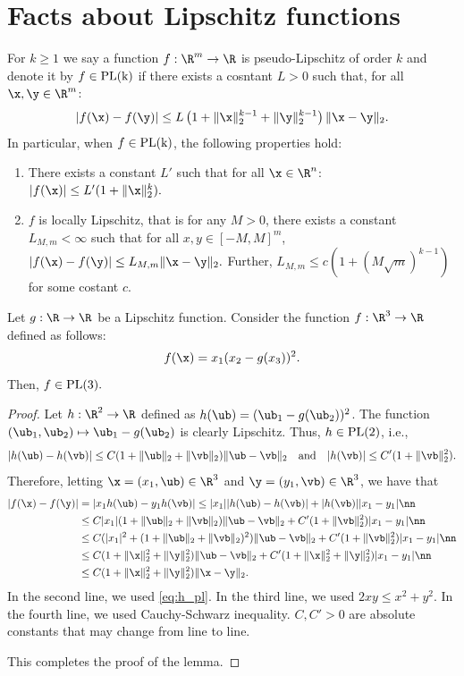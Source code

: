 \section{Facts about Lipschitz functions}\label{SM useful fact}
For $k\geq 1$ we say a function $f:\R^m\rightarrow\R$ is pseudo-Lipschitz of order $k$ and denote it by $f\in \rm{PL}(k)$ if there exists a cosntant $L>0$ such that, for all $\x,\y\in\R^m$:
\begin{align}
|f(\x)-f(\y)|\leq L\left(1+\|\x\|_2^{k-1}+\|\y\|_2^{k-1}\right)\|\x-\y\|_2.\label{PL func}
\end{align}
In particular, when $f\in\rm{PL}(k)$, the following properties hold:
\begin{enumerate}
\item There exists a constant $L'$ such that for all $\x\in\R^n$: $|f(\x)|\leq L'(1+\|\x\|_2^k).$

\item $f$ is locally Lipschitz, that is for any $M>0$, there exists a constant $L_{M,m}<\infty$ such that for all $x,y\in[-M,M]^m$,
$
|f(\x)-f(\y)| \leq L_{M,m}\|\x-\y\|_2.
$
Further, $L_{M,m}\leq c(1+(M\sqrt{m})^{k-1})$ for some costant $c$.
\end{enumerate}


\begin{lemma}
Let $g:\R\rightarrow\R$ be a Lipschitz function. Consider the function $f:\R^3\rightarrow\R$ defined as follows:
$$
f(\x) = x_1(x_2-g(x_3))^2.
$$
Then, $f\in\rm{PL}(3).$
\end{lemma}

\begin{proof}
Let $h:\R^2\rightarrow\R$ defined as $h(\ub)=(\ub_1-g(\ub_2))^2$. The function $(\ub_1,\ub_2)\mapsto\ub_1-g(\ub_2)$ is clearly Lipschitz. Thus, $h\in\rm{PL}(2)$, i.e., 
\begin{align}
|h(\ub)-h(\vb)| \leq C(1+\|\ub\|_2+\|\vb\|_2)\|\ub-\vb\|_2\quad\text{and}\quad |h(\vb)|\leq C'(1+\|\vb\|_2^2).\label{eq:h_pl}
\end{align} 
Therefore, letting $\x=(x_1,\ub)\in\R^3$ and $\y=(y_1,\vb)\in\R^3$, we have that 
\begin{align}
|f(\x)-f(\y)| &= |x_1h(\ub) - y_1h(\vb)| \leq |x_1||h(\ub)-h(\vb)| + |h(\vb)| |x_1-y_1|\nn\\
&\leq C|x_1|(1+\|\ub\|_2+\|\vb\|_2)\|\ub-\vb\|_2 + C'(1+\|\vb\|_2^2)|x_1-y_1| \nn\\
&\leq C(|x_1|^2+(1+\|\ub\|_2+\|\vb\|_2)^2)\|\ub-\vb\|_2 + C'(1+\|\vb\|_2^2)|x_1-y_1| \nn\\
&\leq C(1+\|\x\|_2^2+\|\y\|_2^2)\|\ub-\vb\|_2 + C'(1+\|\x\|_2^2+\|\y\|_2^2)|x_1-y_1| \nn\\
&\leq C(1+\|\x\|_2^2+\|\y\|_2^2)\|\x-\y\|_2.
\end{align}
In the second line, we used \eqref{eq:h_pl}. In the third line, we used $2xy\leq x^2+y^2$. In the fourth line, we used Cauchy-Schwarz inequality. $C,C'>0$ are absolute constants that may change from line to line.

This completes the proof of the lemma.
\end{proof}



